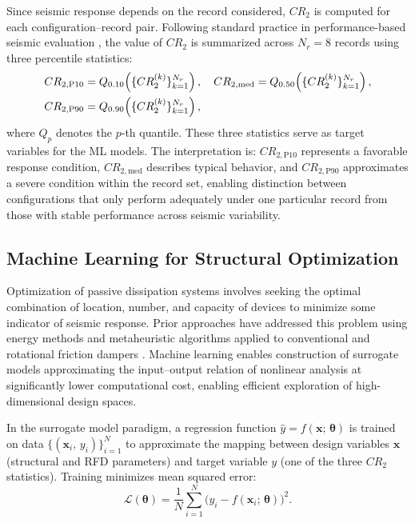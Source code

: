 \documentclass[preprint,12pt,authoryear]{elsarticle}
\newcommand{\CR}[1]{CR_{2,\text{#1}}}
\begin{document}
Since seismic response depends on the record considered, $CR_2$ is computed for each configuration--record
pair. Following standard practice in performance-based seismic evaluation \citep{Kazemi2022}, the value
of $CR_2$ is summarized across $N_r = 8$ records using three percentile statistics:
\begin{align}
    \CR{P10} &= Q_{0.10}\!\left(\{CR_2^{(k)}\}_{k=1}^{N_r}\right), \quad
    \CR{med}  = Q_{0.50}\!\left(\{CR_2^{(k)}\}_{k=1}^{N_r}\right), \notag\\
    \CR{P90} &= Q_{0.90}\!\left(\{CR_2^{(k)}\}_{k=1}^{N_r}\right),
    \label{eq:CR2stats}
\end{align}
where $Q_p$ denotes the $p$-th quantile. These three statistics serve as target variables for the ML
models. The interpretation is: $\CR{P10}$ represents a favorable response condition, $\CR{med}$ describes
typical behavior, and $\CR{P90}$ approximates a severe condition within the record set, enabling distinction
between configurations that only perform adequately under one particular record from those with stable
performance across seismic variability.

\subsection{Machine Learning for Structural Optimization}
\label{sec:theory:ml}

Optimization of passive dissipation systems involves seeking the optimal combination of location, number,
and capacity of devices to minimize some indicator of seismic response. Prior approaches have addressed
this problem using energy methods and metaheuristic algorithms applied to conventional and rotational
friction dampers \citep{moreschi_design_2003, moghaddam_optimal_2022, ontiveros-perez_reliability-based_2019}.
Machine learning enables construction of surrogate models approximating the input--output relation of
nonlinear analysis at significantly lower computational cost, enabling efficient exploration of high-dimensional
design spaces.

In the surrogate model paradigm, a regression function $\hat{y} = f(\bm{x};\,\bm{\theta})$ is trained on data
$\{(\bm{x}_i,\,y_i)\}_{i=1}^{N}$ to approximate the mapping between design variables $\bm{x}$ (structural
and RFD parameters) and target variable $y$ (one of the three $CR_2$ statistics). Training minimizes mean
squared error:
\begin{equation}
    \mathcal{L}(\bm{\theta}) = \frac{1}{N}\sum_{i=1}^{N}
    \bigl(y_i - f(\bm{x}_i;\,\bm{\theta})\bigr)^2.
    \label{eq:mse}
\end{equation}
\end{document}
